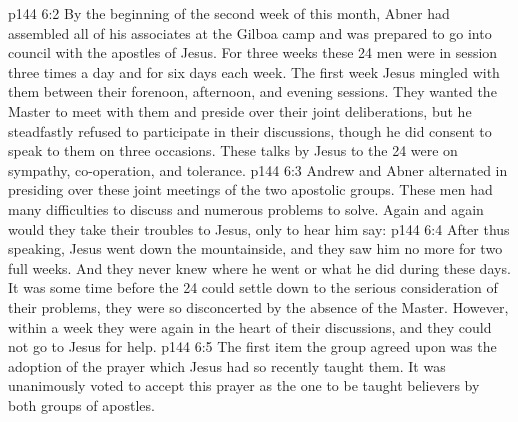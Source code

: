 \vs p144 6:2 By the beginning of the second week of this month, Abner had assembled all of his associates at the Gilboa camp and was prepared to go into council with the apostles of Jesus. For three weeks these 24 men were in session three times a day and for six days each week. The first week Jesus mingled with them between their forenoon, afternoon, and evening sessions. They wanted the Master to meet with them and preside over their joint deliberations, but he steadfastly refused to participate in their discussions, though he did consent to speak to them on three occasions. These talks by Jesus to the 24 were on sympathy, co\hyp{}operation, and tolerance.
\vs p144 6:3 Andrew and Abner alternated in presiding over these joint meetings of the two apostolic groups. These men had many difficulties to discuss and numerous problems to solve. Again and again would they take their troubles to Jesus, only to hear him say: 
\vs p144 6:4 After thus speaking, Jesus went down the mountainside, and they saw him no more for two full weeks. And they never knew where he went or what he did during these days. It was some time before the 24 could settle down to the serious consideration of their problems, they were so disconcerted by the absence of the Master. However, within a week they were again in the heart of their discussions, and they could not go to Jesus for help.
\vs p144 6:5 \pc The first item the group agreed upon was the adoption of the prayer which Jesus had so recently taught them. It was unanimously voted to accept this prayer as the one to be taught believers by both groups of apostles.
